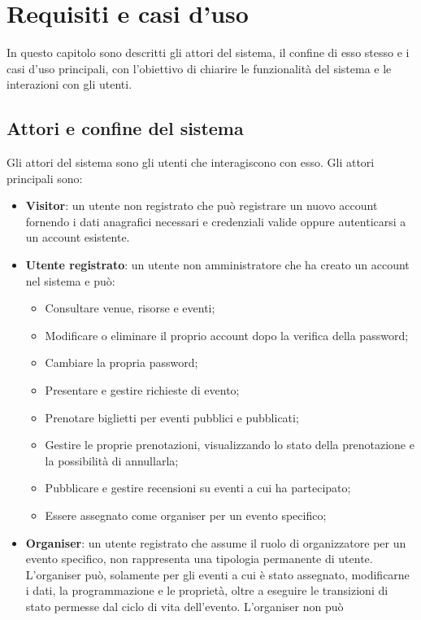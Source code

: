 \chapter{Requisiti e casi d'uso}
\label{cap:requisiti}
In questo capitolo sono descritti gli attori del sistema, il confine di esso stesso e i casi d'uso principali, con l'obiettivo di chiarire le funzionalità del sistema e le interazioni con gli utenti.

\section{Attori e confine del sistema}
Gli attori del sistema sono gli utenti che interagiscono con esso. Gli attori principali sono:
\begin{itemize}
    \item \textbf{Visitor}: un utente non registrato che può registrare un nuovo account fornendo i dati anagrafici necessari e credenziali 
    valide oppure autenticarsi a un account esistente.
    \item \textbf{Utente registrato}: un utente non amministratore che ha creato un account nel sistema e può:
    \begin{itemize}
        \item Consultare venue, risorse e eventi;
        \item Modificare o eliminare il proprio account dopo la verifica della password;
        \item Cambiare la propria password;
        \item Presentare e gestire richieste di evento;
        \item Prenotare biglietti per eventi pubblici e pubblicati;
        \item Gestire le proprie prenotazioni, visualizzando lo stato della prenotazione e la possibilità di annullarla;
        \item Pubblicare e gestire recensioni su eventi a cui ha partecipato;
        \item Essere assegnato come organiser per un evento specifico;
    \end{itemize}
    \item \textbf{Organiser}: un utente registrato che assume il ruolo di organizzatore per un evento specifico, non rappresenta una tipologia 
    permanente di utente. L'organiser può, solamente per gli eventi a cui è stato assegnato, modificarne i dati, la programmazione 
    e le proprietà, oltre a eseguire le transizioni di stato permesse dal ciclo di vita dell'evento. L'organiser non può 

\end{itemize}
